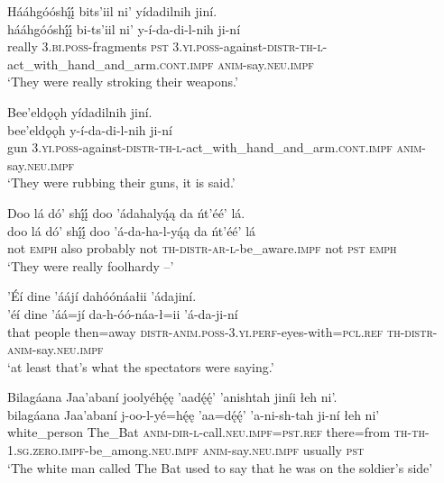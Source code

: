 \ea\label{ex:text1-61-12}
Hááhgóóshį́į́ bits’iil ni’ yídadilnih jiní.\\
\gll hááhgóóshį́į́	bi-ts’iil	ni’	y-í-da-di-l-nih	ji-ní\\
     really	3.\textsc{bi}.\textsc{poss}-fragments	\textsc{pst}	3.\textsc{yi}.\textsc{poss}-against-\textsc{distr}-\textsc{th}-\textsc{l}-act\_with\_hand\_and\_arm.\textsc{cont}.\textsc{impf}	\textsc{anim}-say.\textsc{neu}.\textsc{impf}\\
\glt `They were really stroking their weapons.'
\z

\ea\label{ex:text1-61-13}
Bee’eldǫǫh yídadilnih jiní.\\
\gll bee’eldǫǫh	y-í-da-di-l-nih	ji-ní\\
     gun	3.\textsc{yi}.\textsc{poss}-against-\textsc{distr}-\textsc{th}-\textsc{l}-act\_with\_hand\_and\_arm.\textsc{cont}.\textsc{impf}	\textsc{anim}-say.\textsc{neu}.\textsc{impf}\\
\glt `They were rubbing their guns, it is said.'
\z

\ea\label{ex:text1-61-14}
Doo lá dó’ shį́į́ doo ’ádahalyą́ą da ńt’éé’ lá.\\
\gll doo	lá	dó’	shį́į́	doo	’á-da-ha-l-yą́ą	da	ńt’éé’	lá\\
     not	\textsc{emph}	also	probably	not	\textsc{th}-\textsc{distr}-\textsc{ar}-\textsc{l}-be\_aware.\textsc{impf}	not	\textsc{pst}	\textsc{emph}\\
\glt `They were really foolhardy --'
\z

\ea\label{ex:text1-61-15}
’Éí dine ’áájí dahóónáałii ’ádajiní.\\
\gll ’éí	dine	’áá=jí	da-h-óó-náa-ł=ii	’á-da-ji-ní\\
     that	people	then=away	\textsc{distr}-\textsc{anim}.\textsc{poss}-3.\textsc{yi}.\textsc{perf}-eyes-with=\textsc{pcl}.\textsc{ref}	\textsc{th}-\textsc{distr}-\textsc{anim}-say.\textsc{neu}.\textsc{impf}\\
\glt `at least that's what the spectators were saying.'
\z

\ea\label{ex:text1-62-1}
Bilagáana Jaa’abaní joolyéhę́ę ’aadę́ę́’ ’anishtah jiníi łeh ni’.\\
\gll bilagáana	Jaa’abaní	j-oo-l-yé=hę́ę	’aa=dę́ę́’	’a-ni-sh-tah	ji-ní	łeh	ni’\\
     white\_person	The\_Bat	\textsc{anim}-\textsc{dir}-\textsc{l}-call.\textsc{neu}.\textsc{impf}=\textsc{pst}.\textsc{ref}	there=from	\textsc{th}-\textsc{th}-1.\textsc{sg}.\textsc{zero}.\textsc{impf}-be\_among.\textsc{neu}.\textsc{impf}	\textsc{anim}-say.\textsc{neu}.\textsc{impf}	usually	\textsc{pst}\\
\glt `The white man called The Bat used to say that he was on the soldier's side'
\z

